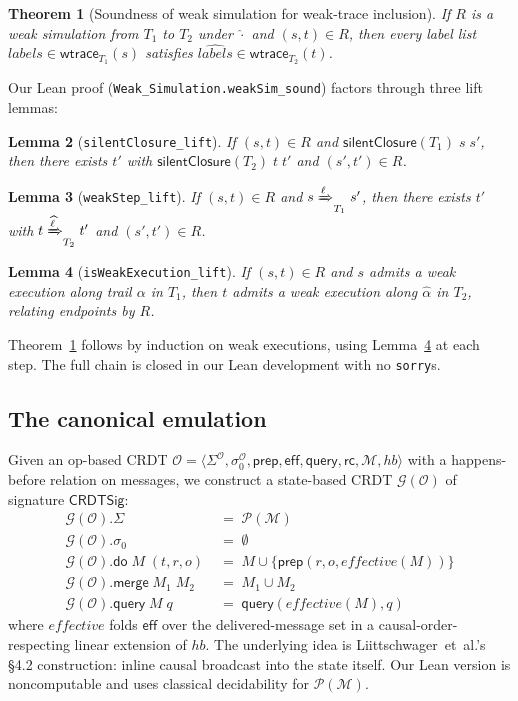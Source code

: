 \documentclass[11pt,a4paper]{article}
\newtheorem{theorem}{Theorem}[section]
\newtheorem{lemma}[theorem]{Lemma}
\theoremstyle{definition}
\theoremstyle{remark}
\newcommand{\mdo}{\mathsf{do}}
\newcommand{\mmerge}{\mathsf{merge}}
\newcommand{\meff}{\mathsf{eff}}
\newcommand{\mquery}{\mathsf{query}}
\newcommand{\mrc}{\mathsf{rc}}
\newcommand{\mprep}{\mathsf{prep}}
\newcommand{\State}{\Sigma}
\newcommand{\init}{\sigma_0}
\newcommand{\Msg}{\mathcal{M}}
\newcommand{\wtrace}{\mathsf{wtrace}}
\newcommand{\Emul}{\mathcal{G}}
\newcommand{\sorry}{\texttt{sorry}}
\begin{document}
\begin{theorem}[Soundness of weak simulation for weak-trace inclusion]
\label{thm:weaksim-sound}
If $R$ is a weak simulation from $T_1$ to $T_2$ under
$\widehat{\cdot}$ and $(s, t) \in R$, then every label list
$\mathit{labels} \in \wtrace_{T_1}(s)$ satisfies
$\widehat{\mathit{labels}} \in \wtrace_{T_2}(t)$.
\end{theorem}

Our Lean proof (\texttt{Weak\_Simulation.weakSim\_sound}) factors
through three lift lemmas:
\begin{lemma}[\texttt{silentClosure\_lift}]
\label{lem:silent-lift}
If $(s, t) \in R$ and $\mathsf{silentClosure}(T_1)\;s\;s'$, then
there exists $t'$ with $\mathsf{silentClosure}(T_2)\;t\;t'$ and
$(s', t') \in R$.
\end{lemma}
\begin{lemma}[\texttt{weakStep\_lift}]
\label{lem:weakstep-lift}
If $(s, t) \in R$ and $s \xRightarrow{\ell}_{T_1} s'$, then there
exists $t'$ with $t \xRightarrow{\widehat{\ell}}_{T_2} t'$ and
$(s', t') \in R$.
\end{lemma}
\begin{lemma}[\texttt{isWeakExecution\_lift}]
\label{lem:weakexec-lift}
If $(s, t) \in R$ and $s$ admits a weak execution along trail
$\alpha$ in $T_1$, then $t$ admits a weak execution along
$\widehat{\alpha}$ in $T_2$, relating endpoints by $R$.
\end{lemma}

Theorem~\ref{thm:weaksim-sound} follows by induction on weak
executions, using Lemma~\ref{lem:weakexec-lift} at each step. The
full chain is closed in our Lean development with no \sorry{}s.

\subsection{The canonical emulation}
\label{sec:canonical-G}

Given an op-based CRDT
$\mathcal{O} = \langle \State^{\mathcal{O}}, \sigma_0^{\mathcal{O}},
\mprep, \meff, \mquery, \mrc, \Msg, \mathit{hb}\rangle$ with a
happens-before relation on messages, we construct a state-based CRDT
$\Emul(\mathcal{O})$ of signature $\mathsf{CRDTSig}$:
\begin{align*}
  \Emul(\mathcal{O}).\State &\;=\; \mathcal{P}(\Msg) \\
  \Emul(\mathcal{O}).\init &\;=\; \emptyset \\
  \Emul(\mathcal{O}).\mdo\;M\;(t, r, o) &\;=\; M \cup \{\mprep(r, o, \mathit{effective}(M))\} \\
  \Emul(\mathcal{O}).\mmerge\;M_1\;M_2 &\;=\; M_1 \cup M_2 \\
  \Emul(\mathcal{O}).\mquery\;M\;q &\;=\; \mquery(\mathit{effective}(M), q)
\end{align*}
where $\mathit{effective}$ folds $\meff$ over the delivered-message
set in a causal-order-respecting linear extension of $\mathit{hb}$.
The underlying idea is Liittschwager~et~al.'s §4.2 construction:
inline causal broadcast into the state itself. Our Lean version is
noncomputable and uses classical decidability for $\mathcal{P}(\Msg)$.
\end{document}

